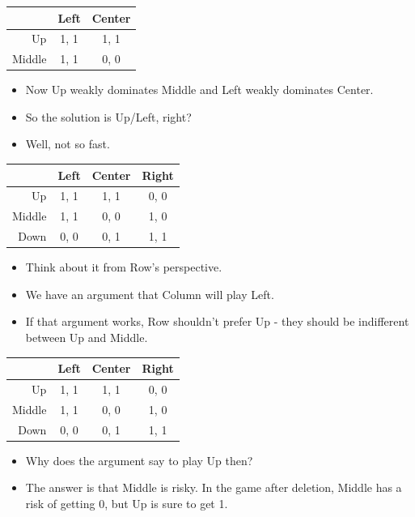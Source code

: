 \documentclass[
  14pt,
  letterpaper,
  ignorenonframetext,
  aspectratio=169,
  handout]{beamer}
\providecommand{\tightlist}{%
  \setlength{\itemsep}{0pt}\setlength{\parskip}{0pt}}\usepackage{longtable,booktabs,array}
\let\olditem\item
\renewcommand{\item}{%
\olditem\vspace{6pt}}
\begin{document}
\begin{frame}
\begin{table}[!h]
\centering
\begin{tabular}[t]{>{}r|cc}
\toprule
 & Left & Center\\
\midrule
Up & 1, 1 & 1, 1\\
Middle & 1, 1 & 0, 0\\
\bottomrule
\end{tabular}
\end{table}

\begin{itemize}[<+->]
\tightlist
\item
  Now Up weakly dominates Middle and Left weakly dominates Center.
\item
  So the solution is Up/Left, right?
\item
  Well, not so fast.
\end{itemize}
\end{frame}

\begin{frame}
\begin{table}[!h]
\centering
\begin{tabular}[t]{>{}r|ccc}
\toprule
 & Left & Center & Right\\
\midrule
Up & 1, 1 & 1, 1 & 0, 0\\
Middle & 1, 1 & 0, 0 & 1, 0\\
Down & 0, 0 & 0, 1 & 1, 1\\
\bottomrule
\end{tabular}
\end{table}

\begin{itemize}[<+->]
\tightlist
\item
  Think about it from Row's perspective.
\item
  We have an argument that Column will play Left.
\item
  If that argument works, Row shouldn't prefer Up - they should be
  indifferent between Up and Middle.
\end{itemize}
\end{frame}

\begin{frame}
\begin{table}[!h]
\centering
\begin{tabular}[t]{>{}r|ccc}
\toprule
 & Left & Center & Right\\
\midrule
Up & 1, 1 & 1, 1 & 0, 0\\
Middle & 1, 1 & 0, 0 & 1, 0\\
Down & 0, 0 & 0, 1 & 1, 1\\
\bottomrule
\end{tabular}
\end{table}

\begin{itemize}[<+->]
\tightlist
\item
  Why does the argument say to play Up then?
\item
  The answer is that Middle is risky. In the game after deletion, Middle
  has a risk of getting 0, but Up is sure to get 1.
\end{itemize}
\end{frame}
\end{document}
